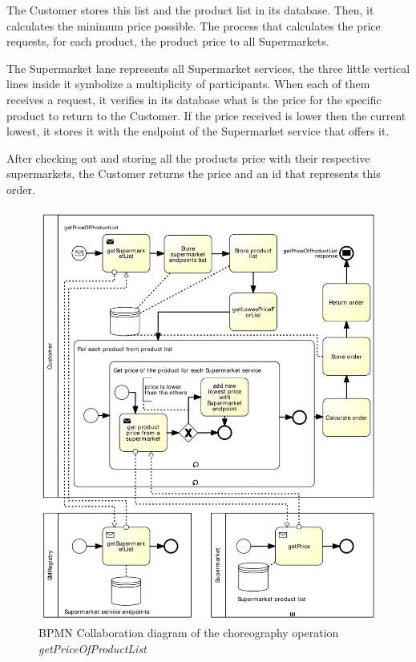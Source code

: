 The Customer stores this list and the product list in its database. Then, it calculates the minimum price possible. The process that calculates the price requests, for each product,  the product price to all Supermarkets.  

The Supermarket lane represents all Supermarket services, the three little vertical lines inside it symbolize a multiplicity of participants. When each of them receives a request, it verifies in its database what is the price for the specific product to return to the Customer. If the price received is lower then the current lowest, it stores it with the endpoint of the Supermarket service that offers it. 

After checking out and storing all the products price with their respective supermarkets, the Customer returns the price and an id that represents this order.

\begin{figure}[htbp]
\begin{center}
	\includegraphics{images/getPriceOfProductListworkflow} 
\caption{BPMN Collaboration diagram of the choreography operation \emph{getPriceOfProductList}}
\label{getPriceOfProductListworkflow}
\end{center}
\end{figure}

